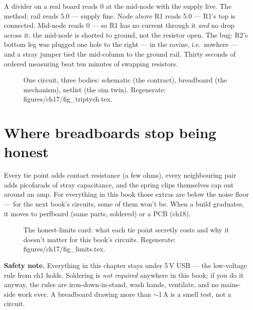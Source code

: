 \begin{example}
A divider on a real board reads 0 at the mid-node with the supply
live. The method: rail reads 5.0 --- supply fine. Node above R1 reads
5.0 --- R1's top is connected. Mid-node reads 0 --- so R1 has no
current through it \emph{and} no drop across it: the mid-node is
shorted to ground, not the resistor open. The bug: R2's bottom leg
was plugged one hole to the right --- in the ravine, i.e.\ nowhere
--- and a stray jumper tied the mid-column to the ground rail.
Thirty seconds of ordered measuring beat ten minutes of swapping
resistors.
\end{example}

\begin{figure}[htbp]
\centering

\caption{One circuit, three bodies: schematic (the contract),
breadboard (the mechanism), netlist (the sim twin). Regenerate:
\ttfamily figures/ch17/fig\_triptych.tex.}
\label{fig:triptych17}
\end{figure}

\section{Where breadboards stop being honest}\label{sec:limits17}

Every tie point adds contact resistance (a few ohms), every
neighbouring pair adds picofarads of stray capacitance, and the
spring clips themselves cap out around an amp. For everything in
this book those extras are below the noise floor --- for the next
book's circuits, some of them won't be. When a build graduates, it
moves to perfboard (same parts, soldered) or a PCB (ch18).

\begin{figure}[htbp]
\centering

\caption{The honest-limits card: what each tie point secretly costs
and why it doesn't matter for this book's circuits. Regenerate:
\ttfamily figures/ch17/fig\_limits.tex.}
\label{fig:limits17}
\end{figure}

\textbf{Safety note.} Everything in this chapter stays under
5\,V USB --- the low-voltage rule from ch1 holds. Soldering is
\emph{not required} anywhere in this book; if you do it anyway, the
rules are iron-down-in-stand, wash hands, ventilate, and no
mains-side work ever. A breadboard drawing more than $\sim$1\,A
is a smell test, not a circuit.

